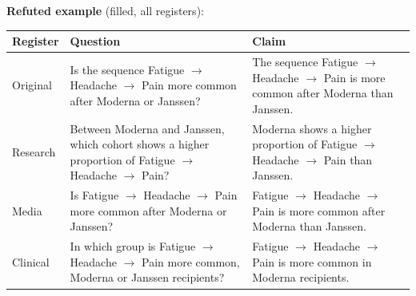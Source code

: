 \documentclass[11pt]{article}
\begin{document}
\vspace{3pt}
\textbf{Refuted example} (filled, all registers): \\
\begin{tabularx}{\linewidth}{@{}l L L@{}}
\toprule
\textbf{Register} & \textbf{Question} & \textbf{Claim} \\
\midrule
Original & Is the sequence Fatigue $\rightarrow$  Headache $\rightarrow$  Pain more common after Moderna or Janssen? & The sequence Fatigue $\rightarrow$  Headache $\rightarrow$  Pain is more common after Moderna than Janssen. \\
Research & Between Moderna and Janssen, which cohort shows a higher proportion of Fatigue $\rightarrow$  Headache $\rightarrow$  Pain? & Moderna shows a higher proportion of Fatigue $\rightarrow$  Headache $\rightarrow$  Pain than Janssen. \\
Media & Is Fatigue $\rightarrow$  Headache $\rightarrow$  Pain more common after Moderna or Janssen? & Fatigue $\rightarrow$  Headache $\rightarrow$  Pain is more common after Moderna than Janssen. \\
Clinical & In which group is Fatigue $\rightarrow$  Headache $\rightarrow$  Pain more common, Moderna or Janssen recipients? & Fatigue $\rightarrow$  Headache $\rightarrow$  Pain is more common in Moderna recipients. \\
\bottomrule
\end{tabularx}
\vspace{3pt}
\end{document}
